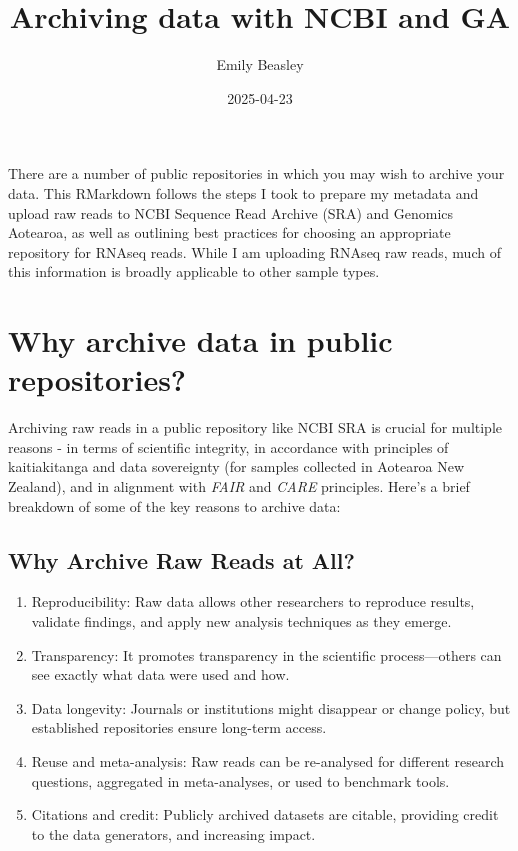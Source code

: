 \documentclass[
]{article}
\title{Archiving data with NCBI and GA}
\author{Emily Beasley}
\date{2025-04-23}
\begin{document}
\maketitle

{
\setcounter{tocdepth}{2}
\tableofcontents
}
There are a number of public repositories in which you may wish to
archive your data. This RMarkdown follows the steps I took to prepare my
metadata and upload raw reads to NCBI Sequence Read Archive (SRA) and
Genomics Aotearoa, as well as outlining best practices for choosing an
appropriate repository for RNAseq reads. While I am uploading RNAseq raw
reads, much of this information is broadly applicable to other sample
types.

\hypertarget{why-archive-data-in-public-repositories}{%
\section{Why archive data in public
repositories?}\label{why-archive-data-in-public-repositories}}

Archiving raw reads in a public repository like NCBI SRA is crucial for
multiple reasons - in terms of scientific integrity, in accordance with
principles of kaitiakitanga and data sovereignty (for samples collected
in Aotearoa New Zealand), and in alignment with \emph{FAIR} and
\emph{CARE} principles. Here's a brief breakdown of some of the key
reasons to archive data:

\hypertarget{why-archive-raw-reads-at-all}{%
\subsection{Why Archive Raw Reads at
All?}\label{why-archive-raw-reads-at-all}}

\begin{enumerate}
\def\labelenumi{\arabic{enumi}.}
\item
  Reproducibility: Raw data allows other researchers to reproduce
  results, validate findings, and apply new analysis techniques as they
  emerge.
\item
  Transparency: It promotes transparency in the scientific
  process---others can see exactly what data were used and how.
\item
  Data longevity: Journals or institutions might disappear or change
  policy, but established repositories ensure long-term access.
\item
  Reuse and meta-analysis: Raw reads can be re-analysed for different
  research questions, aggregated in meta-analyses, or used to benchmark
  tools.
\item
  Citations and credit: Publicly archived datasets are citable,
  providing credit to the data generators, and increasing impact.
\end{enumerate}
\end{document}
